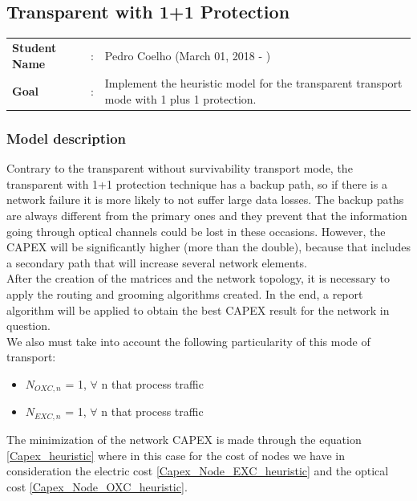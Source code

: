 \clearpage

\subsection{Transparent with 1+1 Protection}\label{heuristic_Transp_Protection}
\begin{tcolorbox}	
\begin{tabular}{p{2.75cm} p{0.2cm} p{10.5cm}} 	
\textbf{Student Name}  &:& Pedro Coelho    (March 01, 2018 - )\\
\textbf{Goal}          &:& Implement the heuristic model for the transparent transport mode with 1 plus 1 protection.
\end{tabular}
\end{tcolorbox}

\subsubsection{Model description}

Contrary to the transparent without survivability transport mode, the transparent with 1+1 protection technique has a backup path, so if there is a network failure it is more likely to not suffer large data losses. The backup paths are always different from the primary ones and they prevent that the information going through optical channels could be lost in these occasions. However, the CAPEX will be significantly higher (more than the double), because that includes a secondary path that will increase several network elements.\\
After the creation of the matrices and the network topology, it is necessary to apply the routing and grooming algorithms created. In the end, a report algorithm will be applied to obtain the best CAPEX result for the network in question.\\
We also must take into account the following particularity of this mode of transport:
\begin{itemize}
  \item $N_{OXC,n}$ = 1, \quad $\forall$ n that process traffic
  \item $N_{EXC,n}$ = 1, \quad $\forall$ n that process traffic
\end{itemize}

\vspace{11pt}
The minimization of the network CAPEX is made through the equation \ref{Capex_heuristic} where in this case for the cost of nodes we have in consideration the electric cost \ref{Capex_Node_EXC_heuristic} and the optical cost \ref{Capex_Node_OXC_heuristic}.\\

